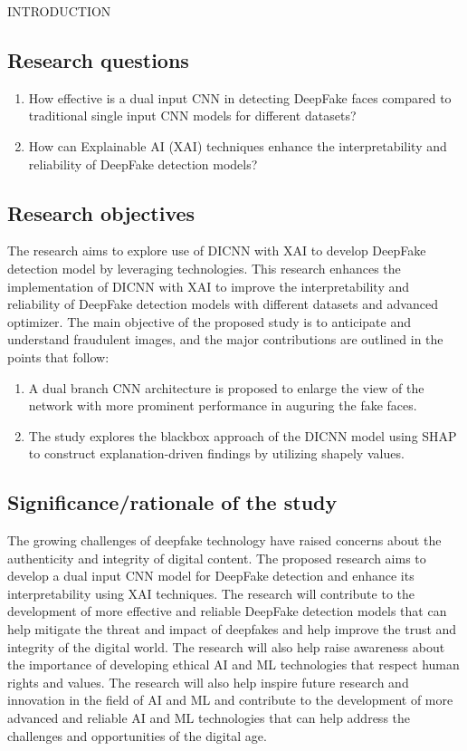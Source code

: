 \begin{section}[]{\uppercase{Introduction}}
    \subsection{Research questions}

    \begin{enumerate}[label=\bf{Q\arabic*}]
        \item How effective is a dual input CNN in detecting DeepFake faces compared to traditional single input CNN models for different datasets?
        \item How can Explainable AI (XAI) techniques enhance the interpretability and reliability of DeepFake detection models?
    \end{enumerate}

    \subsection{Research objectives}
    The research aims to explore use of DICNN with XAI to develop DeepFake detection model by leveraging technologies. This research enhances the implementation of DICNN with XAI to improve the interpretability and reliability of DeepFake detection models with different datasets and advanced optimizer.
    The main objective of the proposed study is to anticipate and understand fraudulent images, and the major contributions are outlined in the points that follow:
    \begin{enumerate}[label=\bf{O\arabic*}]
        \item A dual branch CNN architecture is proposed to enlarge the view of the network with more prominent performance in auguring the fake faces.
        \item The study explores the blackbox approach of the DICNN model using SHAP to construct explanation-driven findings by utilizing shapely values.
    \end{enumerate}

    
    \subsection{Significance/rationale of the study}
    The growing challenges of deepfake technology have raised concerns about the authenticity and integrity of digital content. 
    The proposed research aims to develop a dual input CNN model for DeepFake detection and enhance its interpretability using XAI techniques. 
    The research will contribute to the development of more effective and reliable DeepFake detection models that can help mitigate the threat and impact of deepfakes and help improve the trust and integrity of the digital world. 
    The research will also help raise awareness about the importance of developing ethical AI and ML technologies that respect human rights and values. 
    The research will also help inspire future research and innovation in the field of AI and ML and contribute to the development of more advanced and reliable AI and ML technologies that can help address the challenges and opportunities of the digital age.


\end{section}
